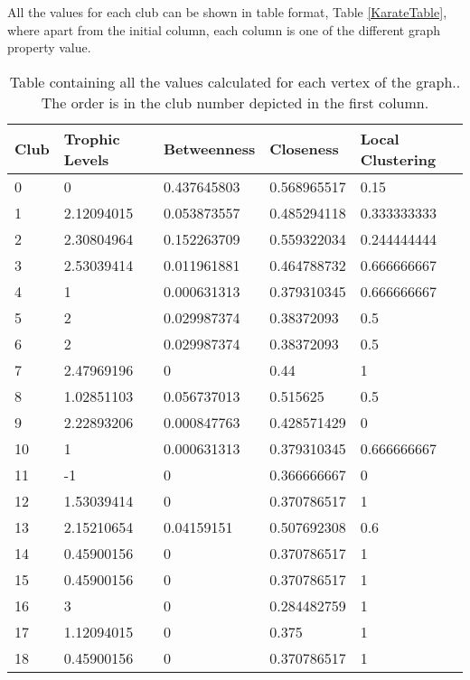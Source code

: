 All the values for each club can be shown in table format, Table \ref{KarateTable}, where apart from the initial column, each column is one of the different graph property value.

\begin{table}[H]
    \centering
    \small
    \caption{Table containing all the values calculated for each vertex of the graph.. The order is in the club number depicted in the first column.}
    \begin{tabular}{|l|l|l|l|l|}
        \hline
        \textbf{Club} & \textbf{Trophic Levels} & \textbf{Betweenness} & \textbf{Closeness} & \textbf{Local Clustering} \\ \hline
        0 & 0 & 0.437645803 & 0.568965517 & 0.15 \\ \hline
        1 & 2.12094015 & 0.053873557 & 0.485294118 & 0.333333333 \\ \hline
        2 & 2.30804964 & 0.152263709 & 0.559322034 & 0.244444444 \\ \hline
        3 & 2.53039414 & 0.011961881 & 0.464788732 & 0.666666667 \\ \hline
        4 & 1 & 0.000631313 & 0.379310345 & 0.666666667 \\ \hline
        5 & 2 & 0.029987374 & 0.38372093 & 0.5 \\ \hline
        6 & 2 & 0.029987374 & 0.38372093 & 0.5 \\ \hline
        7 & 2.47969196 & 0 & 0.44 & 1 \\ \hline
        8 & 1.02851103 & 0.056737013 & 0.515625 & 0.5 \\ \hline
        9 & 2.22893206 & 0.000847763 & 0.428571429 & 0 \\ \hline
        10 & 1 & 0.000631313 & 0.379310345 & 0.666666667 \\ \hline
        11 & -1 & 0 & 0.366666667 & 0 \\ \hline
        12 & 1.53039414 & 0 & 0.370786517 & 1 \\ \hline
        13 & 2.15210654 & 0.04159151 & 0.507692308 & 0.6 \\ \hline
        14 & 0.45900156 & 0 & 0.370786517 & 1 \\ \hline
        15 & 0.45900156 & 0 & 0.370786517 & 1 \\ \hline
        16 & 3 & 0 & 0.284482759 & 1 \\ \hline
        17 & 1.12094015 & 0 & 0.375 & 1 \\ \hline
        18 & 0.45900156 & 0 & 0.370786517 & 1 \\ \hline

\end{tabular}
\end{table}
